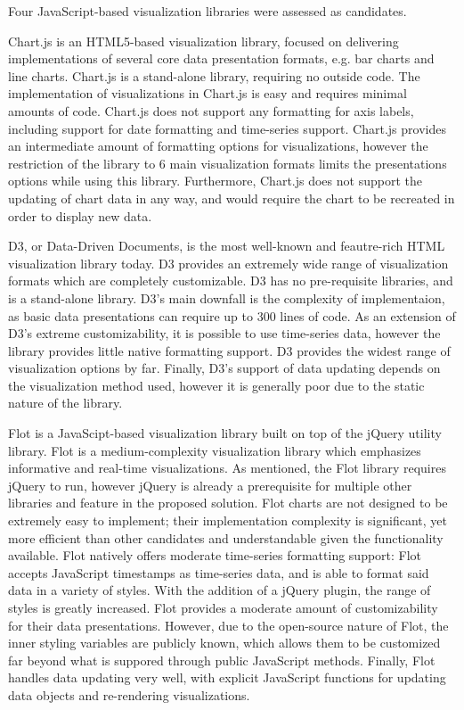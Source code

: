 \documentclass{report}
\begin{document}
Four JavaScript-based visualization libraries were assessed as candidates.

Chart.js is an HTML5-based visualization library, focused on delivering implementations of several core data presentation formats, e.g. bar charts and line charts. Chart.js is a stand-alone library, requiring no outside code. The implementation of visualizations in Chart.js is easy and requires minimal amounts of code. Chart.js does not support any formatting for axis labels, including support for date formatting and time-series support. Chart.js provides an intermediate amount of formatting options for visualizations, however the restriction of the library to 6 main visualization formats limits the presentations options while using this library. Furthermore, Chart.js does not support the updating of chart data in any way, and would require the chart to be recreated in order to display new data.

D3, or Data-Driven Documents, is the most well-known and feautre-rich HTML visualization library today. D3 provides an extremely wide range of visualization formats which are completely customizable. D3 has no pre-requisite libraries, and is a stand-alone library. D3's main downfall is the complexity of implementaion, as basic data presentations can require up to 300 lines of code. As an extension of D3's extreme customizability, it is possible to use time-series data, however the library provides little native formatting support. D3 provides the widest range of visualization options by far. Finally, D3's support of data updating depends on the visualization method used, however it is generally poor due to the static nature of the library.

Flot is a JavaScipt-based visualization library built on top of the jQuery utility library. Flot is a medium-complexity visualization library which emphasizes informative and real-time visualizations. As mentioned, the Flot library requires jQuery to run, however jQuery is already a prerequisite for multiple other libraries and feature in the proposed solution. Flot charts are not designed to be extremely easy to implement; their implementation complexity is significant, yet more efficient than other candidates and understandable given the functionality available. Flot natively offers moderate time-series formatting support: Flot accepts JavaScript timestamps as time-series data, and is able to format said data in a variety of styles. With the addition of a jQuery plugin, the range of styles is greatly increased. Flot provides a moderate amount of customizability for their data presentations. However, due to the open-source nature of Flot, the inner styling variables are publicly known, which allows them to be customized far beyond what is suppored through public JavaScript methods. Finally, Flot handles data updating very well, with explicit JavaScript functions for updating data objects and re-rendering visualizations.
\end{document}
